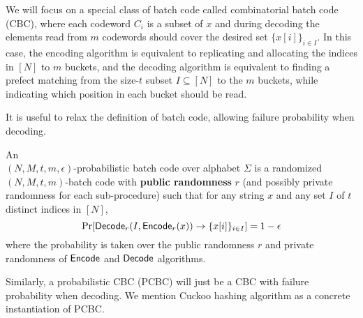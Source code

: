We will focus on a special class of batch code called combinatorial batch code (CBC)\cite{10.1145/1007352.1007396,cryptoeprint:2008/306}, where each codeword $C_i$ is a subset of $x$ and during decoding the elements read from $m$ codewords should cover the desired set $\{x[i]\}_{i\in I}$. 
 In this case, the encoding algorithm is equivalent to replicating and allocating the indices in $[N]$ to $m$ buckets, and the decoding algorithm is equivalent to finding a prefect matching from the size-$t$ subset $I\subseteq[N]$ to the $m$ buckets, while indicating which position in each bucket should be read. 


It is useful to relax the definition of batch code, allowing failure probability when decoding. 

\begin{definition}
An\\ $(N,M,t,m,\epsilon)$-probabilistic batch code over alphabet $\Sigma$ is a randomized $(N,M,t,m)$-batch code with \textbf{public randomness} $r$ (and possibly private randomness for each sub-procedure) such that for any string $x$ and any set $I$ of $t$ distinct indices in $[N]$, 
\[
  \Pr[{\sf Decode}_r(I,{\sf Encode}_r(x))\rightarrow \{x[i]\}_{i\in I}] = 1-\epsilon
\]
where the probability is taken over the public randomness $r$ and private randomness of  ${\sf Encode}$ and ${\sf Decode}$ algorithms. 
\end{definition}

Similarly, a probabilistic CBC (PCBC) will just be a CBC with failure probability when decoding. We mention Cuckoo hashing algorithm\cite{10.1007/3-540-44676-1_10} as a concrete instantiation of PCBC\cite{cryptoeprint:2017/1142,yeo_cuckoo_2023}.

